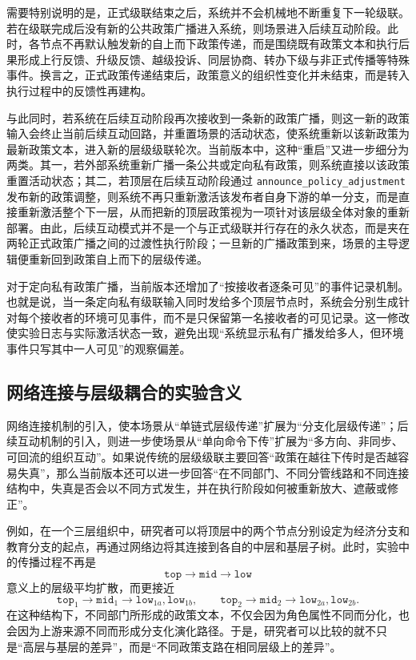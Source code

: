 \documentclass{article}
\begin{document}
需要特别说明的是，正式级联结束之后，系统并不会机械地不断重复下一轮级联。若在级联完成后没有新的公共政策广播进入系统，则场景进入后续互动阶段。此时，各节点不再默认触发新的自上而下政策传递，而是围绕既有政策文本和执行后果形成上行反馈、升级反馈、越级投诉、同层协商、转办下级与非正式传播等特殊事件。换言之，正式政策传递结束后，政策意义的组织性变化并未结束，而是转入执行过程中的反馈性再建构。

与此同时，若系统在后续互动阶段再次接收到一条新的政策广播，则这一新的政策输入会终止当前后续互动回路，并重置场景的活动状态，使系统重新以该新政策为最新政策文本，进入新的层级级联轮次。当前版本中，这种“重启”又进一步细分为两类。其一，若外部系统重新广播一条公共或定向私有政策，则系统直接以该政策重置活动状态；其二，若顶层在后续互动阶段通过 \texttt{announce\_policy\_adjustment} 发布新的政策调整，则系统不再只重新激活该发布者自身下游的单一分支，而是直接重新激活整个下一层，从而把新的顶层政策视为一项针对该层级全体对象的重新部署。由此，后续互动模式并不是一个与正式级联并行存在的永久状态，而是夹在两轮正式政策广播之间的过渡性执行阶段；一旦新的广播政策到来，场景的主导逻辑便重新回到政策自上而下的层级传递。

对于定向私有政策广播，当前版本还增加了“按接收者逐条可见”的事件记录机制。也就是说，当一条定向私有级联输入同时发给多个顶层节点时，系统会分别生成针对每个接收者的环境可见事件，而不是只保留第一名接收者的可见记录。这一修改使实验日志与实际激活状态一致，避免出现“系统显示私有广播发给多人，但环境事件只写其中一人可见”的观察偏差。

\subsection{网络连接与层级耦合的实验含义}

网络连接机制的引入，使本场景从“单链式层级传递”扩展为“分支化层级传递”；后续互动机制的引入，则进一步使场景从“单向命令下传”扩展为“多方向、非同步、可回流的组织互动”。如果说传统的层级级联主要回答“政策在越往下传时是否越容易失真”，那么当前版本还可以进一步回答“在不同部门、不同分管线路和不同连接结构中，失真是否会以不同方式发生，并在执行阶段如何被重新放大、遮蔽或修正”。

例如，在一个三层组织中，研究者可以将顶层中的两个节点分别设定为经济分支和教育分支的起点，再通过网络边将其连接到各自的中层和基层子树。此时，实验中的传播过程不再是
\[
\texttt{top}\rightarrow \texttt{mid}\rightarrow \texttt{low}
\]
意义上的层级平均扩散，而更接近
\[
\texttt{top}_1\rightarrow \texttt{mid}_1\rightarrow \texttt{low}_{1a},\texttt{low}_{1b},
\qquad
\texttt{top}_2\rightarrow \texttt{mid}_2\rightarrow \texttt{low}_{2a},\texttt{low}_{2b}.
\]
在这种结构下，不同部门所形成的政策文本，不仅会因为角色属性不同而分化，也会因为上游来源不同而形成分支化演化路径。于是，研究者可以比较的就不只是“高层与基层的差异”，而是“不同政策支路在相同层级上的差异”。
\end{document}
